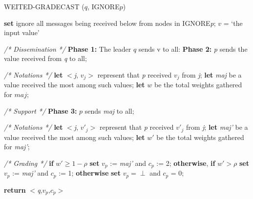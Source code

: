 \documentclass[conference]{IEEEtran}
\begin{document}
\begin{algorithm}
\caption{WEITED-GRADECAST ($q$, IGNORE{$p$})}
\begin{algorithmic}[1]
\STATE \textbf{set} ignore all messages being received below from nodes in IGNORE\textit{p};
\STATE $v$ = \lq{the input value}\rq
\ENDIF
\item[]
\item[]
\textit{/* Dissemination */}
\STATE \textbf{Phase 1:} The leader $q$ sends v to all:
\STATE \textbf{Phase 2:} \textit{p} sends the value received from \textit{q} to all;
\item[]
\item[]
\textit{/* Notations */}
\STATE \textbf{let} $<$\textit{j}, \textit{${v}_{j}$}$>$ represent that \textit{p} received \textit{${v}_{j}$} from \textit{j};
\STATE \textbf{let} \textit{maj} be a value received the most among such values;
\STATE \textbf{let} $w$ be the total weights gathered for $maj$;
\item[]
\item[]
\textit{/* Support */}
\STATE \textbf{Phase 3:}  
\STATE $p$ sends \textit{maj} to all;
\ENDIF
\item[]
\item[]
\textit{/* Notations */}
\STATE \textbf{let} $<$\textit{j}, \textit{${v'}_{j}$}$>$ represent that \textit{p} received \textit{${v'}_{j}$} from \textit{j};
\STATE \textbf{let} \textit{maj'} be a value received the most among such values;
\STATE \textbf{let} $w'$ be the total weights gathered for \textit{maj'};
\item[]
\item[]
\textit{/* Grading */}
\STATE \textbf{if} $w' \geq 1 - \rho $  \textbf{set} \textit{${v}_{p}$} := \textit{maj'} and \textit{${c}_{p}$} := 2;
\STATE \textbf{otherwise}, \textbf{if} $w' > \rho $ \textbf{set} \textit{${v}_{p}$} := \textit{maj'} and \textit{${c}_{p}$} := 1;
\STATE  \textbf{otherwise} \textbf{set} $\textit{${v}_{p}$} = \perp$ and \textit{${c}_{p}$} = 0;
\item[]
\STATE \textbf{return} $<$\textit{q},\textit{${v}_{p}$},\textit{${c}_{p}$}$>$
\end{algorithmic}
\end{algorithm}
\end{document}
